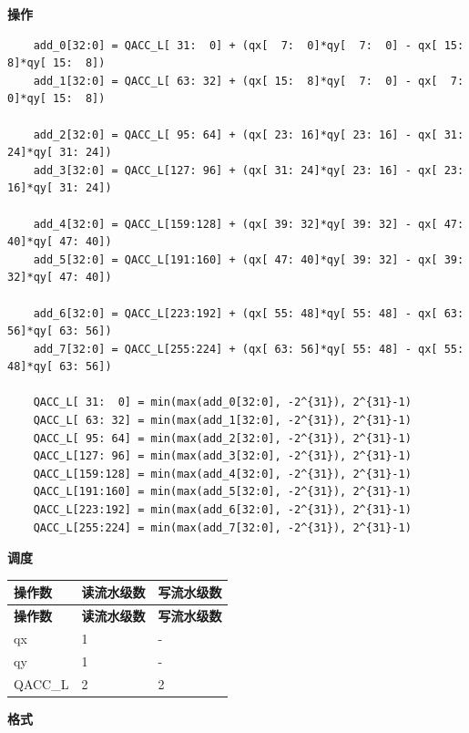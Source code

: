 \textbf{操作}\\
\begin{lstlisting}
    add_0[32:0] = QACC_L[ 31:  0] + (qx[  7:  0]*qy[  7:  0] - qx[ 15:  8]*qy[ 15:  8])
    add_1[32:0] = QACC_L[ 63: 32] + (qx[ 15:  8]*qy[  7:  0] - qx[  7:  0]*qy[ 15:  8])

    add_2[32:0] = QACC_L[ 95: 64] + (qx[ 23: 16]*qy[ 23: 16] - qx[ 31: 24]*qy[ 31: 24])
    add_3[32:0] = QACC_L[127: 96] + (qx[ 31: 24]*qy[ 23: 16] - qx[ 23: 16]*qy[ 31: 24])

    add_4[32:0] = QACC_L[159:128] + (qx[ 39: 32]*qy[ 39: 32] - qx[ 47: 40]*qy[ 47: 40])
    add_5[32:0] = QACC_L[191:160] + (qx[ 47: 40]*qy[ 39: 32] - qx[ 39: 32]*qy[ 47: 40])

    add_6[32:0] = QACC_L[223:192] + (qx[ 55: 48]*qy[ 55: 48] - qx[ 63: 56]*qy[ 63: 56])
    add_7[32:0] = QACC_L[255:224] + (qx[ 63: 56]*qy[ 55: 48] - qx[ 55: 48]*qy[ 63: 56])

    QACC_L[ 31:  0] = min(max(add_0[32:0], -2^{31}), 2^{31}-1)
    QACC_L[ 63: 32] = min(max(add_1[32:0], -2^{31}), 2^{31}-1)
    QACC_L[ 95: 64] = min(max(add_2[32:0], -2^{31}), 2^{31}-1)
    QACC_L[127: 96] = min(max(add_3[32:0], -2^{31}), 2^{31}-1)
    QACC_L[159:128] = min(max(add_4[32:0], -2^{31}), 2^{31}-1)
    QACC_L[191:160] = min(max(add_5[32:0], -2^{31}), 2^{31}-1)
    QACC_L[223:192] = min(max(add_6[32:0], -2^{31}), 2^{31}-1)
    QACC_L[255:224] = min(max(add_7[32:0], -2^{31}), 2^{31}-1)

\end{lstlisting}

\textbf{调度}\\
\begin{longtable}[c]{|l|l|l|}
    \hline
    \rowcolor{lightgray}
    \textbf{操作数} & \textbf{读流水级数} & \textbf{写流水级数} \\\hline
    \endfirsthead
    \hline
    \rowcolor{lightgray}
     \textbf{操作数} & \textbf{读流水级数} & \textbf{写流水级数} \\\hline
    \endhead
    \hline
    \endfoot

     qx & 1 & - \\\hline
     qy & 1 & - \\\hline
     QACC\_L & 2 & 2

\end{longtable}

\textbf{格式}\\

